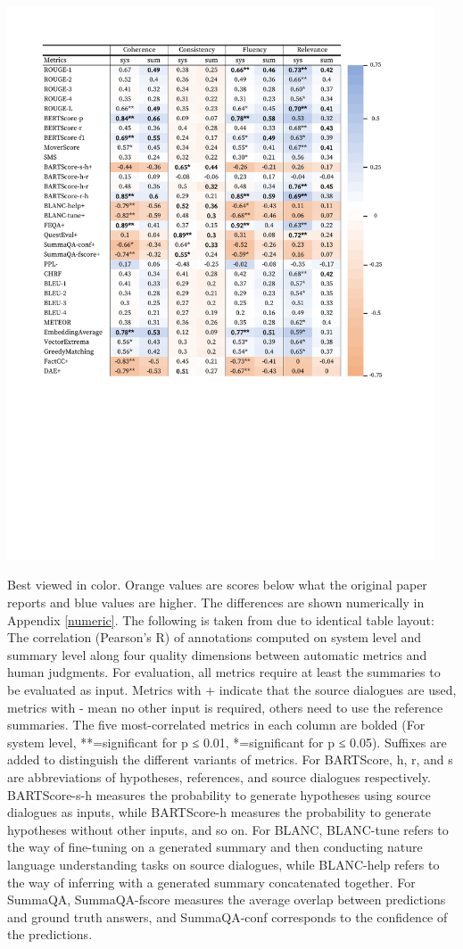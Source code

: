 \begin{table}[H]
     \centering
         \includegraphics[clip, trim=1.8cm 9cm 2.5cm 1.8cm, width=0.95\textwidth]{figures/corr_comp.pdf}
         \caption{Best viewed in color. Orange values are scores below what the original paper reports and blue values are higher. The differences are shown numerically in Appendix \ref{numeric}. The following is taken from \citet{gao2022dialsummeval} due to identical table layout: The correlation (Pearson’s R) of annotations computed on system level and summary level along four quality dimensions between automatic metrics and human judgments. For evaluation, all metrics require at least the summaries to be evaluated as input. Metrics with + indicate that the source dialogues are used, metrics with - mean no other input is required, others need to use the reference summaries. The five most-correlated metrics in each column are bolded (For system level, **=significant for p ≤ 0.01, *=significant for p ≤ 0.05). Suffixes are added to distinguish the different variants of metrics. For BARTScore, h, r, and s are abbreviations of hypotheses, references, and source dialogues respectively. BARTScore-s-h measures the probability to generate hypotheses using source dialogues as inputs, while BARTScore-h measures the probability to generate hypotheses without other inputs, and so on. For BLANC, BLANC-tune refers to the way of fine-tuning on a generated summary and then conducting nature language understanding tasks on source dialogues, while BLANC-help refers to the way of inferring with a generated summary concatenated together. For SummaQA, SummaQA-fscore measures the average overlap between predictions and ground truth answers, and SummaQA-conf corresponds to the confidence of the predictions. }

\end{table}
